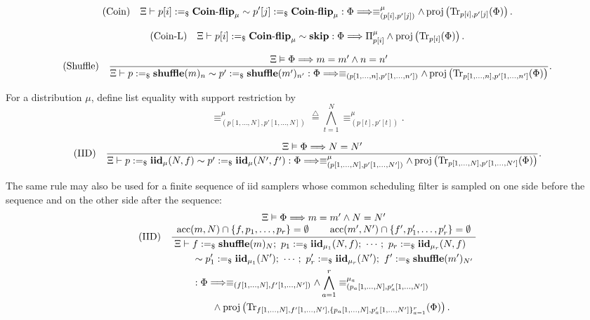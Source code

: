 \documentclass[acmsmall,screen,review,anonymous,nonacm]{acmart}
\theoremstyle{defn_style}
\begin{document}
\[
\text{\rm (Coin)}
\quad
\Xi
\vdash
p[i]:=_{\$}\mathbf{Coin\mbox{-}flip}_{\mu}
\sim
p'[j]:=_{\$}\mathbf{Coin\mbox{-}flip}_{\mu}
:
\Phi
\Longrightarrow
\equiv^{\mu}_{(p[i],p'[j])}
\land
\operatorname{proj}
\left(
\operatorname{Tr}_{p[i],p'[j]}(\Phi)
\right).
\]

\[
\text{\rm (Coin-L)}
\quad
\Xi
\vdash
p[i]:=_{\$}\mathbf{Coin\mbox{-}flip}_{\mu}
\sim
\mathbf{skip}
:
\Phi
\Longrightarrow
\Pi^\mu_{p[i]}
\land
\operatorname{proj}
\left(
\operatorname{Tr}_{p[i]}(\Phi)
\right).
\]

\[
\text{\rm (Shuffle)}
\quad
\frac{
\Xi
\vDash
\Phi\Longrightarrow m=m'\land n=n'
}{
\Xi
\vdash
p:=_{\$}\mathbf{shuffle}(m)_n
\sim
p':=_{\$}\mathbf{shuffle}(m')_{n'}
:
\Phi
\Longrightarrow
\equiv_{(p[1,\ldots,n],p'[1,\ldots,n'])}
\land
\operatorname{proj}
\left(
\operatorname{Tr}_{p[1,\ldots,n],p'[1,\ldots,n']}(\Phi)
\right)
}.
\]

For a distribution \(\mu\), define list equality with support restriction by
\[
\equiv^{\mu}_{(p[1,\ldots,N],p'[1,\ldots,N])}
\stackrel{\triangle}{=}
\bigwedge_{t=1}^{N}
\equiv^{\mu}_{(p[t],p'[t])}.
\]

\[
\text{\rm (IID)}
\quad
\frac{
\Xi\vDash\Phi\Longrightarrow  N=N'
}{
\Xi
\vdash
p:=_{\$}\mathbf{iid}_{\mu}(N,f)
\sim
p':=_{\$}\mathbf{iid}_{\mu}(N',f')
:
\Phi
\Longrightarrow
\equiv^{\mu}_{(p[1,\ldots,N],p'[1,\ldots,N'])}
\land
\operatorname{proj}
\left(
\operatorname{Tr}_{p[1,\ldots,N],p'[1,\ldots,N']}(\Phi)
\right)
}.
\]

The same rule may also be used for a finite sequence of iid samplers whose
common scheduling filter is sampled on one side before the sequence and on the
other side after the sequence:
\[
\text{\rm (IID)}
\quad
\frac{
\begin{array}{c}
\Xi\vDash\Phi\Longrightarrow  m=m'\land N=N'
\\
\operatorname{acc}(m,N)\cap\{f,p_1,\ldots,p_r\}=\emptyset
\qquad
\operatorname{acc}(m',N')\cap\{f',p'_1,\ldots,p'_r\}=\emptyset
\end{array}
}{
\begin{aligned}
\Xi
\vdash\;&
f:=_{\$}\mathbf{shuffle}(m)_N;\
p_1:=_{\$}\mathbf{iid}_{\mu_1}(N,f);\
\cdots;\
p_r:=_{\$}\mathbf{iid}_{\mu_r}(N,f)
\\
&\sim
p'_1:=_{\$}\mathbf{iid}_{\mu_1}(N');\
\cdots;\
p'_r:=_{\$}\mathbf{iid}_{\mu_r}(N');\
f':=_{\$}\mathbf{shuffle}(m')_{N'}
\\
&:
\Phi
\Longrightarrow
\equiv_{(f[1,\ldots,N],f'[1,\ldots,N'])}
\land
\bigwedge_{a=1}^{r}
\equiv^{\mu_a}_{(p_a[1,\ldots,N],p'_a[1,\ldots,N'])}
\\
&\qquad\land
\operatorname{proj}
\left(
\operatorname{Tr}_{
f[1,\ldots,N],f'[1,\ldots,N'],
\{p_a[1,\ldots,N],p'_a[1,\ldots,N']\}_{a=1}^{r}
}
(\Phi)
\right).
\end{aligned}
}
\]
\end{document}
